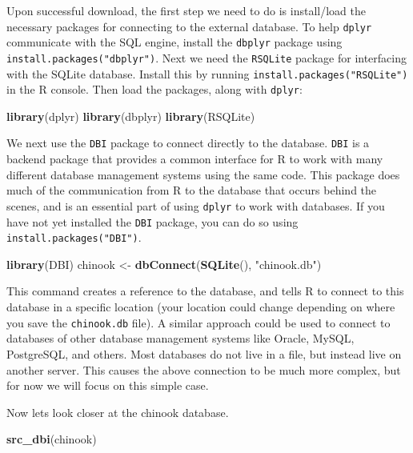 \documentclass[
]{krantz}
\newenvironment{Shaded}{\begin{snugshade}}{\end{snugshade}}
\newcommand{\KeywordTok}[1]{\textcolor[rgb]{0.13,0.29,0.53}{\textbf{#1}}}
\newcommand{\NormalTok}[1]{#1}
\newcommand{\StringTok}[1]{\textcolor[rgb]{0.31,0.60,0.02}{#1}}
\begin{document}
Upon successful download, the first step we need to do is install/load the necessary packages for connecting to the external database. To help \texttt{dplyr} communicate with the SQL engine, install the \texttt{dbplyr} package using \texttt{install.packages("dbplyr")}. Next we need the \texttt{RSQLite} package for interfacing with the SQLite database. Install this by running \texttt{install.packages("RSQLite")} in the R console. Then load the packages, along with \texttt{dplyr}:

\begin{Shaded}
\begin{Highlighting}[]
\KeywordTok{library}\NormalTok{(dplyr)}
\KeywordTok{library}\NormalTok{(dbplyr)}
\KeywordTok{library}\NormalTok{(RSQLite)}
\end{Highlighting}
\end{Shaded}

We next use the \texttt{DBI} package to connect directly to the database. \texttt{DBI} is a backend package that provides a common interface for R to work with many different database management systems using the same code. This package does much of the communication from R to the database that occurs behind the scenes, and is an essential part of using \texttt{dplyr} to work with databases. If you have not yet installed the \texttt{DBI} package, you can do so using \texttt{install.packages("DBI")}.

\begin{Shaded}
\begin{Highlighting}[]
\KeywordTok{library}\NormalTok{(DBI)}
\NormalTok{chinook \textless{}{-}}\StringTok{ }\KeywordTok{dbConnect}\NormalTok{(}\KeywordTok{SQLite}\NormalTok{(), }\StringTok{"chinook.db"}\NormalTok{)}
\end{Highlighting}
\end{Shaded}

This command creates a reference to the database, and tells R to connect to this database in a specific location (your location could change depending on where you save the \texttt{chinook.db} file). A similar approach could be used to connect to databases of other database management systems like Oracle, MySQL, PostgreSQL, and others. Most databases do not live in a file, but instead live on another server. This causes the above connection to be much more complex, but for now we will focus on this simple case.

Now lets look closer at the chinook database.

\begin{Shaded}
\begin{Highlighting}[]
\KeywordTok{src\_dbi}\NormalTok{(chinook)}
\end{Highlighting}
\end{Shaded}
\end{document}
